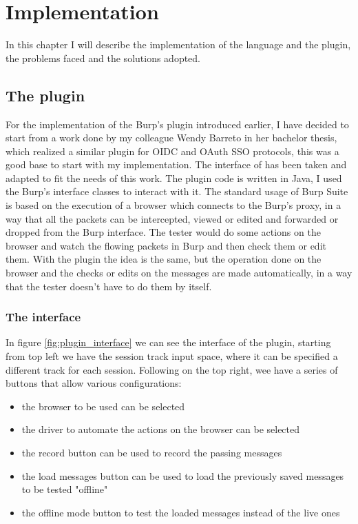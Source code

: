 \chapter{Implementation}
In this chapter I will describe the implementation of the language and the plugin, the problems faced and the solutions adopted.

\section{The plugin}
For the implementation of the Burp's plugin introduced earlier, I have decided to start from a work done by my colleague Wendy Barreto \cite{wendy_barreto} in her bachelor thesis, which realized a similar plugin for OIDC and OAuth SSO protocols, this was a good base to start with my implementation. The interface of \cite{wendy_barreto} has been taken and adapted to fit the needs of this work. The plugin code is written in Java, I used the Burp's interface classes to interact with it.
The standard usage of Burp Suite is based on the execution of a browser which connects to the Burp's proxy, in a way that all the packets can be intercepted, viewed or edited and forwarded or dropped from the Burp interface. The tester would do some actions on the browser and watch the flowing packets in Burp and then check them or edit them. With the plugin the idea is the same, but the operation done on the browser and the checks or edits on the messages are made automatically, in a way that the tester doesn't have to do them by itself.

\subsection{The interface}
In figure \ref{fig:plugin_interface} we can see the interface of the plugin, starting from top left we have the session track input space, where it can be specified a different track for each session. Following on the top right, wee have a series of buttons that allow various configurations:
\begin{itemize}
    \item the browser to be used can be selected
    \item the driver to automate the actions on the browser can be selected
    \item the record button can be used to record the passing messages
    \item the load messages button can be used to load the previously saved messages to be tested "offline"
    \item the offline mode button to test the loaded messages instead of the live ones
\end{itemize}

